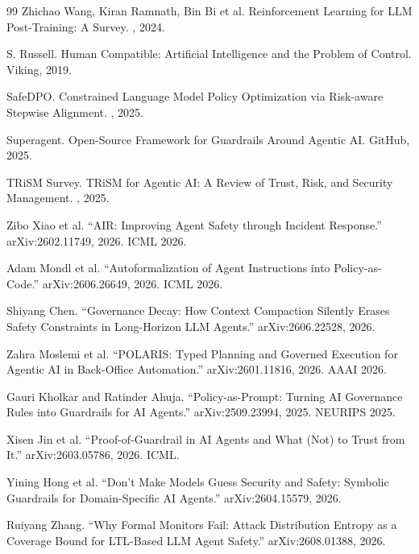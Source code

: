\documentclass[11pt]{book}
\begin{document}
\begin{thebibliography}{99}
Zhichao Wang, Kiran Ramnath, Bin Bi et al.
\newblock Reinforcement Learning for LLM Post-Training: A Survey.
, 2024.

S. Russell.
\newblock Human Compatible: Artificial Intelligence and the Problem of Control.
\newblock Viking, 2019.

SafeDPO.
\newblock Constrained Language Model Policy Optimization via Risk-aware Stepwise Alignment.
, 2025.

Superagent.
\newblock Open-Source Framework for Guardrails Around Agentic AI.
\newblock GitHub, 2025.

TRiSM Survey.
\newblock TRiSM for Agentic AI: A Review of Trust, Risk, and Security Management.
, 2025.


Zibo Xiao et al.
``AIR: Improving Agent Safety through Incident Response.''
arXiv:2602.11749, 2026. ICML 2026.

Adam Mondl et al.
``Autoformalization of Agent Instructions into Policy-as-Code.''
arXiv:2606.26649, 2026. ICML 2026.

Shiyang Chen.
``Governance Decay: How Context Compaction Silently Erases Safety Constraints in Long-Horizon LLM Agents.''
arXiv:2606.22528, 2026.

Zahra Moslemi et al.
``POLARIS: Typed Planning and Governed Execution for Agentic AI in Back-Office Automation.''
arXiv:2601.11816, 2026. AAAI 2026.

Gauri Kholkar and Ratinder Ahuja.
``Policy-as-Prompt: Turning AI Governance Rules into Guardrails for AI Agents.''
arXiv:2509.23994, 2025. NEURIPS 2025.

Xisen Jin et al.
``Proof-of-Guardrail in AI Agents and What (Not) to Trust from It.''
arXiv:2603.05786, 2026. ICML.

Yining Hong et al.
``Don't Make Models Guess Security and Safety: Symbolic Guardrails for Domain-Specific AI Agents.''
arXiv:2604.15579, 2026.

Ruiyang Zhang.
``Why Formal Monitors Fail: Attack Distribution Entropy as a Coverage Bound for LTL-Based LLM Agent Safety.''
arXiv:2608.01388, 2026.
\end{thebibliography}
\end{document}

